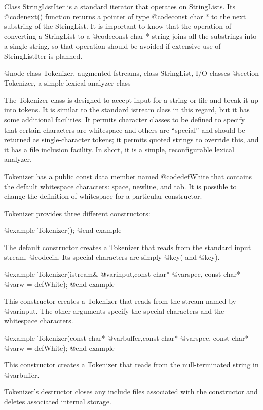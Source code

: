 Class StringListIter is a standard iterator that operates on
StringLists.  Its @code{next()} function returns a pointer of type
@code{const char *} to the next substring of the StringList.
It is important to know that the operation of converting a
StringList to a @code{const char *} string joins all the substrings into
a single string, so that operation should be avoided if extensive
use of StringListIter is planned.

@node class Tokenizer, augmented fstreams, class StringList, I/O classes
@section Tokenizer, a simple lexical analyzer class

The Tokenizer class is designed to accept input for a string or file
and break it up into tokens.  It is similar to the standard istream
class in this regard, but it has some additional facilities.  It
permits character classes to be defined to specify that certain
characters are whitespace and others are ``special'' and should be
returned as single-character tokens; it permits quoted strings to
override this, and it has a file inclusion facility.  In short, it
is a simple, reconfigurable lexical analyzer.


Tokenizer has a public const data member named @code{defWhite}
that contains the default whitespace characters: space, newline,
and tab.  It is possible to change the definition of whitespace
for a particular constructor.

Tokenizer provides three different constructors:

@example
Tokenizer();
@end example

The default constructor creates a Tokenizer that reads from the
standard input stream, @code{cin}.  Its special characters are
simply @key{(} and @key{)}.

@example
Tokenizer(istream& @var{input},const char* @var{spec},
          const char* @var{w} = defWhite);
@end example

This constructor creates a Tokenizer that reads from the stream named
by @var{input}.  The other arguments specify the special characters
and the whitespace characters.

@example
Tokenizer(const char* @var{buffer},const char* @var{spec},
          const char* @var{w} = defWhite);
@end example

This constructor creates a Tokenizer that reads from the null-terminated
string in @var{buffer}.

Tokenizer's destructor closes any include files associated with the
constructor and deletes associated internal storage.

